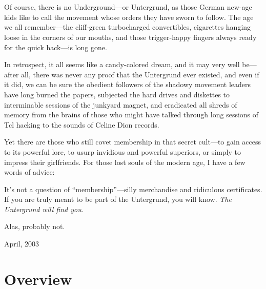 \chapter*{}

\thispagestyle{empty}

Of course, there is no Underground---or Untergrund, as those German
new-age kids like to call the movement whose orders they
have sworn to follow.  The age we all remember---the cliff-green
turbocharged convertibles, cigarettes hanging loose in the corners of
our mouths, and those trigger-happy fingers always ready for the quick
hack---is long gone.

In retrospect, it all seems like a candy-colored dream, and it may
very well be---after all, there was never any proof that the
Untergrund ever existed, and even if it did, we can be sure the
obedient followers of the shadowy movement leaders have long burned
the papers, subjected the hard drives and diskettes to interminable
sessions of the junkyard magnet, and eradicated all shreds of
memory from the brains of those who might have talked through long
sessions of Tcl hacking to the sounds of Celine Dion records.

Yet there are those who still covet membership in that secret
cult---to gain access to its powerful lore, to usurp invidious and
powerful superiors, or simply to impress their girlfriends.  For those
lost souls of the modern age, I have a few words of advice:

It's not a question of ``membership''---silly merchandise and
ridiculous certificates.  If you are truly meant to be part of the
Untergrund, you will know.  \emph{The Untergrund will find you.}

Alas, probably not.

\medskip

\hfill April, 2003

\chapter{Overview}\label{sec:intro}

